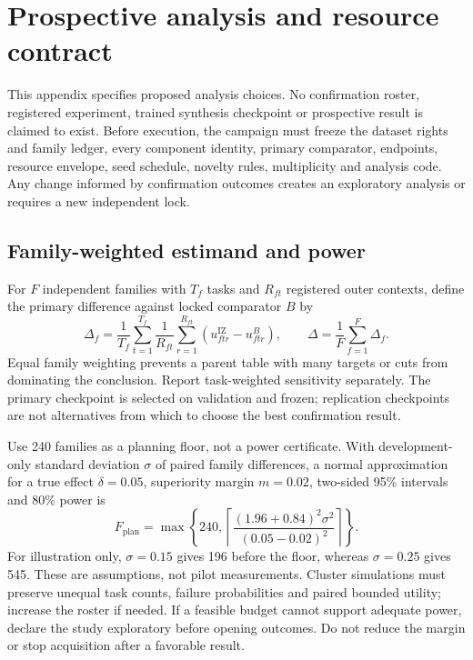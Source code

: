 \section{Prospective analysis and resource contract}
\label{sup:statistics}

This appendix specifies proposed analysis choices. No confirmation roster,
registered experiment, trained synthesis checkpoint or prospective result is
claimed to exist. Before execution, the campaign must freeze the dataset rights
and family ledger, every component identity, primary comparator, endpoints,
resource envelope, seed schedule, novelty rules, multiplicity and analysis code.
Any change informed by confirmation outcomes creates an exploratory analysis or
requires a new independent lock.

\subsection{Family-weighted estimand and power}

For $F$ independent families with $T_f$ tasks and $R_{ft}$ registered outer
contexts, define the primary difference against locked comparator $B$ by
\begin{equation}
 \Delta_f=\frac{1}{T_f}\sum_{t=1}^{T_f}
   \frac{1}{R_{ft}}\sum_{r=1}^{R_{ft}}
       (u^{\mathrm{IZ}}_{ftr}-u^B_{ftr}),\qquad
 \Delta=\frac{1}{F}\sum_{f=1}^{F}\Delta_f.
\end{equation}
Equal family weighting prevents a parent table with many targets or cuts from
dominating the conclusion. Report task-weighted sensitivity separately. The
primary checkpoint is selected on validation and frozen; replication checkpoints
are not alternatives from which to choose the best confirmation result.

Use 240 families as a planning floor, not a power certificate. With
development-only standard deviation $\sigma$ of paired family differences, a
normal approximation for a true effect $\delta=0.05$, superiority margin
$m=0.02$, two-sided 95\% intervals and 80\% power is
\begin{equation}
 F_{\mathrm{plan}}=\max\!\left\{240,
 \left\lceil\frac{(1.96+0.84)^2\sigma^2}{(0.05-0.02)^2}\right\rceil\right\}.
\end{equation}
For illustration only, $\sigma=0.15$ gives 196 before the floor, whereas
$\sigma=0.25$ gives 545. These are assumptions, not pilot measurements. Cluster
simulations must preserve unequal task counts, failure probabilities and paired
bounded utility; increase the roster if needed. If a feasible budget cannot
support adequate power, declare the study exploratory before opening outcomes.
Do not reduce the margin or stop acquisition after a favorable result.


